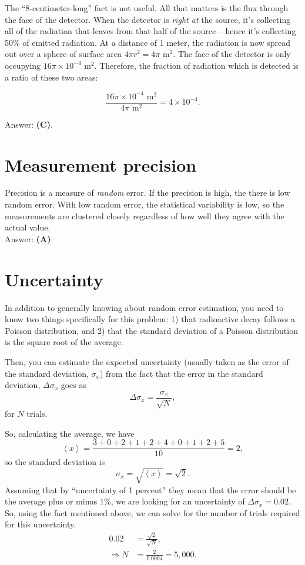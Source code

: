 \documentclass[11pt]{paper}
\newcommand{\answer}[1]{Answer: \textbf{(#1)}.}
\begin{document}
The ``8-centimeter-long'' fact is not useful.  All that matters is the flux through the face of the detector.  When the detector is \emph{right at} the source, it's collecting all of the radiation that leaves from that half of the source \--- hence it's collecting 50\% of emitted radiation.  At a distance of 1 meter, the radiation is now spread out over a sphere of surface area $4 \pi r^2 = 4 \pi \text{ m}^2$.  The face of the detector is only occupying $16 \pi \times 10^{-4} \text{ m}^2$.  Therefore, the fraction of radiation which is detected is a ratio of these two areas:

\begin{equation}
\frac{16 \pi \times 10^{-4} \text{ m}^2}{4 \pi \text{ m}^2} = 4 \times 10^{-4}.
\end{equation}

\answer{C}

\section{Measurement precision}

Precision is a measure of \emph{random} error.  If the precision is high, the there is low random error.  With low random error, the statistical variability is low, so the measurements are clustered closely regardless of how well they agree with the actual value.\\

\answer{A}

\section{Uncertainty}
In addition to generally knowing about random error estimation, you need to know two things specifically for this problem:  1) that radioactive decay follows a Poisson distribution, and 2) that the standard deviation of a Poisson distribution is the square root of the average.

Then, you can estimate the expected uncertainty (usually taken as the error of the standard deviation, $\sigma_x$) from the fact that the error in the standard deviation, $\Delta\sigma_x$ goes as 
\begin{equation}
\Delta\sigma_x = \frac{\sigma_x}{\sqrt{N}},
\end{equation}
for $N$ trials.

So, calculating the average, we have
\begin{equation}
\left<x\right> = \frac{3+0+2+1+2+4+0+1+2+5}{10} = 2,
\end{equation}
so the standard deviation is 
\begin{equation}
\sigma_x = \sqrt{\left<x\right>} = \sqrt{2}.
\end{equation}
Assuming that by ``uncertainty of 1 percent'' they mean that the error should be the average plus or minus 1\%, we are looking for an uncertainty of $\Delta\sigma_x = 0.02$.  So, using the fact mentioned above, we can solve for the number of trials required for this uncertainty.
\begin{align}
0.02 &= \frac{\sqrt{2}}{\sqrt{N}},\\
\Rightarrow N &= \frac{2}{0.0004} = 5,000.
\end{align}
\end{document}
